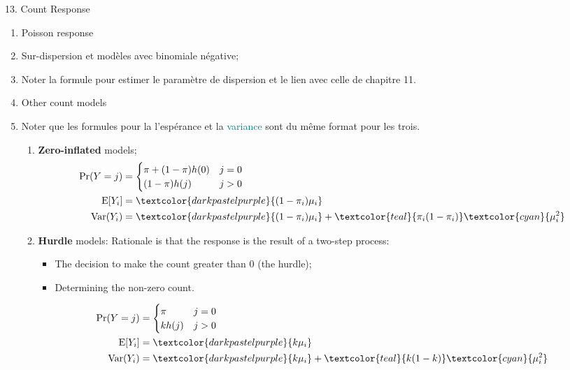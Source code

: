 \documentclass[12pt, titlepage, french]{report}
\begin{document}
\begin{CHPT_SUMM}{13. Count Response}
\begin{enumerate}
	\item	Poisson response
	\item	Sur-dispersion et modèles avec binomiale négative;
	\item[]	Noter la formule pour estimer le paramètre de dispersion et le lien avec celle de chapitre 11.
	\item	Other count models
	\item[]	Noter que les formules pour la \textcolor{darkpastelpurple}{l'espérance} et la \textcolor{teal}{variance} sont du même format pour les trois.
	\begin{enumerate}
		\item	\textbf{Zero-inflated} models;
		\begin{align*}
			\Pr(Y = j) &= 
			\begin{cases}
				\pi	+ (1 - \pi) h(0)	&	j = 0	\\
				(1 - \pi) h(j)		&	j > 0	\\
			\end{cases}	\\
			\text{E}[Y_{i}]		&=	\textcolor{darkpastelpurple}{(1 - \pi_{i}) \mu_{i}}	\\
			\text{Var}(Y_{i})	&=	\textcolor{darkpastelpurple}{(1 - \pi_{i}) \mu_{i}} + \textcolor{teal}{\pi_{i} (1 - \pi_{i})} \textcolor{cyan}{\mu_{i}^{2}}
		\end{align*}
		\item	\textbf{Hurdle} models: Rationale is that the response is the result of a two-step process:
		\begin{itemize}
			\item	The decision to make the count greater than 0 (the hurdle);
			\item	Determining the non-zero count.
		\end{itemize}
		\begin{align*}
			\Pr(Y = j) &= 
			\begin{cases}
				\pi	&	j = 0	\\
				k h(j)	&	j > 0	\\
			\end{cases}	\\
			\text{E}[Y_{i}]		&=	\textcolor{darkpastelpurple}{k \mu_{i}}	\\
			\text{Var}(Y_{i})	&=	\textcolor{darkpastelpurple}{k \mu_{i}} + \textcolor{teal}{k (1 - k)} \textcolor{cyan}{\mu_{i}^{2}} \\

\end{align*}
\end{enumerate}
\end{enumerate}
\end{CHPT_SUMM}
\end{document}
